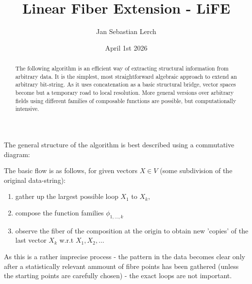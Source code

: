 \documentclass{article}
\begin{document}
\title{Linear Fiber Extension - LiFE}
\author{Jan Sebastian Lerch}
\date{April 1st 2026}
\maketitle

\begin{abstract}
The following algorithm is an efficient way of extracting structural information from arbitrary data. It is the simplest, most straightforward algebraic approach to extend an arbitrary bit-string. As it uses concatenation as a basic structural bridge, vector spaces become but a temporary road to local resolution. More general versions over arbitrary fields using different families of composable functions are possible, but computationally intensive.
\end{abstract}

The general structure of the algorithm is best described using a commutative diagram:
\begin{center}
\end{center}

The basic flow is as follows, for given vectors $X \in V$ (some subdivision of the original data-string):

\begin{enumerate}
\item gather up the largest possible loop $X_1$ to $X_k$,
\item compose the function families $\phi_{1,\dots,k}$
\item observe the fiber of the composition at the origin to obtain new 'copies' of the last vector $X_k$ w.r.t $X_1, X_2,\dots$
\end{enumerate}

As this is a rather imprecise process - the pattern in the data becomes clear only after a statistically relevant ammount of fibre points has been gathered (unless the starting points are carefully chosen) - the exact loops are not important.
\end{document}
